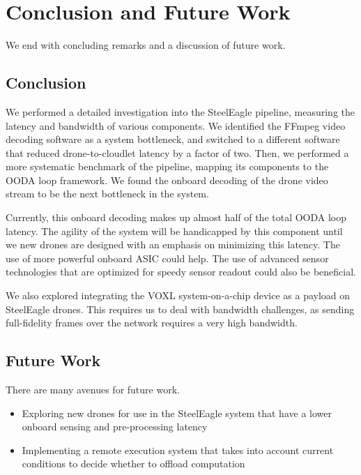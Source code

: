 \chapter{Conclusion and Future Work}
\label{ch:conclusion}

We end with concluding remarks and a discussion of future work.

\section{Conclusion}

We performed a detailed investigation into the SteelEagle pipeline,
measuring the latency and bandwidth of various components. We identified
the FFmpeg video decoding software as a system bottleneck, and switched to
a different software that reduced drone-to-cloudlet latency by a factor of two.
Then, we performed a more systematic benchmark of the pipeline, mapping its
components to the OODA loop framework. We found the onboard decoding of the
drone video stream to be the next bottleneck in the system.

Currently, this onboard decoding makes up almost half of the total OODA loop
latency. The agility of the system will be handicapped by this component until
we new drones are designed with an emphasis on minimizing this latency. The
use of more powerful onboard ASIC could help. The use of advanced sensor
technologies that are optimized for speedy sensor readout could also be
beneficial.

We also explored integrating the VOXL system-on-a-chip device as a payload
on SteelEagle drones. This requires us to deal with bandwidth challenges,
as sending full-fidelity frames over the network requires a very high
bandwidth.

\section{Future Work}

There are many avenues for future work.
\begin{itemize}
    \item Exploring new drones for use in the SteelEagle system that have a
        lower onboard sensing and pre-processing latency
    \item Implementing a remote execution system that takes into account
        current conditions to decide whether to offload computation
\end{itemize}
